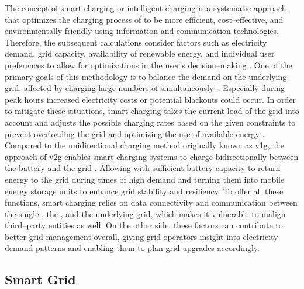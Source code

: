 The concept of smart charging or intelligent charging is a systematic approach that optimizes the charging process of  to be more efficient, cost--effective, and environmentally friendly using information and communication technologies.
Therefore, the subsequent calculations consider factors such as electricity demand, grid capacity, availability of renewable energy, and individual user preferences to allow for optimizations in the user's decision--making \cite{deb_smart_2022}.
One of the primary goals of this methodology is to balance the demand on the underlying grid, affected by charging large numbers of  simultaneously~\cite{daina_electric_2017}. Especially during peak hours increased electricity costs or potential blackouts could occur.
In order to mitigate these situations, smart charging takes the current load of the grid into account and adjusts the possible charging rates based on the given constraints to prevent overloading the grid and optimizing the use of available energy \cite{garcia-villalobos_plug-electric_2014}.
Compared to the unidirectional charging method originally known as \acrfull{v1g}, the approach of \acrfull{v2g} enables smart charging systems to charge bidirectionally between the  battery and the grid \cite[199]{kathiresh_e-mobility_2022}. Allowing  with sufficient battery capacity to return energy to the grid during times of high demand and turning them into mobile energy storage units to enhance grid stability and resiliency.
To offer all these functions, smart charging relies on data connectivity and communication between the single , the , and the underlying grid, which makes it vulnerable to malign third--party entities as well. On the other side, these factors can contribute to better grid management overall, giving grid operators insight into electricity demand patterns and enabling them to plan grid upgrades accordingly.

\subsection{Smart Grid}
\label{ch:Fundamentals:sec:Electric Mobility:ssec:Smart Grid}

